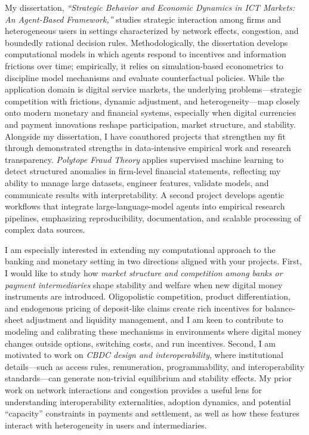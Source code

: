 \documentclass[11pt]{article}
\begin{document}
My dissertation, \textit{``Strategic Behavior and Economic Dynamics in ICT Markets: An Agent-Based Framework,''} studies strategic interaction among firms and heterogeneous users in settings characterized by network effects, congestion, and boundedly rational decision rules. Methodologically, the dissertation develops computational models in which agents respond to incentives and information frictions over time; empirically, it relies on simulation-based econometrics to discipline model mechanisms and evaluate counterfactual policies. While the application domain is digital service markets, the underlying problems---strategic competition with frictions, dynamic adjustment, and heterogeneity---map closely onto modern monetary and financial systems, especially when digital currencies and payment innovations reshape participation, market structure, and stability.
Alongside my dissertation, I have coauthored projects that strengthen my fit through demonstrated strengths in data-intensive empirical work and research transparency. 
\textit{Polytope Fraud Theory} applies supervised machine learning to detect structured anomalies in firm-level financial statements, reflecting my ability to manage large datasets, engineer features, validate models, and communicate results with interpretability. A second project develops agentic workflows that integrate large-language-model agents into empirical research pipelines, emphasizing reproducibility, documentation, and scalable processing of complex data sources.

I am especially interested in extending my computational approach to the banking and monetary setting in two directions aligned with your projects. First, I would like to study how \emph{market structure and competition among banks or payment intermediaries} shape stability and welfare when new digital money instruments are introduced. Oligopolistic competition, product differentiation, and endogenous pricing of deposit-like claims create rich incentives for balance-sheet adjustment and liquidity management, and I am keen to contribute to modeling and calibrating these mechanisms in environments where digital money changes outside options, switching costs, and run incentives. 
Second, I am motivated to work on \emph{CBDC design and interoperability}, where institutional details---such as access rules, remuneration, programmability, and interoperability standards---can generate non-trivial equilibrium and stability effects. My prior work on network interactions and congestion provides a useful lens for understanding interoperability externalities, adoption dynamics, and potential ``capacity'' constraints in payments and settlement, as well as how these features interact with heterogeneity in users and intermediaries.
\end{document}
